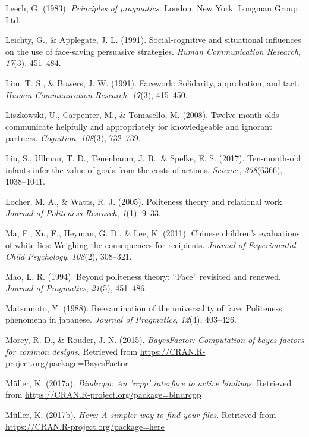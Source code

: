 \documentclass[oneside]{report}
\begin{document}
\hypertarget{ref-leech1983}{}
Leech, G. (1983). \emph{Principles of pragmatics}. London, New York:
Longman Group Ltd.

\hypertarget{ref-leichty1991}{}
Leichty, G., \& Applegate, J. L. (1991). Social-cognitive and
situational influences on the use of face-saving persuasive strategies.
\emph{Human Communication Research}, \emph{17}(3), 451--484.

\hypertarget{ref-lim1991}{}
Lim, T. S., \& Bowers, J. W. (1991). Facework: Solidarity, approbation,
and tact. \emph{Human Communication Research}, \emph{17}(3), 415--450.

\hypertarget{ref-liszkowski2008}{}
Liszkowski, U., Carpenter, M., \& Tomasello, M. (2008).
Twelve-month-olds communicate helpfully and appropriately for
knowledgeable and ignorant partners. \emph{Cognition}, \emph{108}(3),
732--739.

\hypertarget{ref-liu2017ten}{}
Liu, S., Ullman, T. D., Tenenbaum, J. B., \& Spelke, E. S. (2017).
Ten-month-old infants infer the value of goals from the costs of
actions. \emph{Science}, \emph{358}(6366), 1038--1041.

\hypertarget{ref-locher2005}{}
Locher, M. A., \& Watts, R. J. (2005). Politeness theory and relational
work. \emph{Journal of Politeness Research}, \emph{1}(1), 9--33.

\hypertarget{ref-ma2011}{}
Ma, F., Xu, F., Heyman, G. D., \& Lee, K. (2011). Chinese children's
evaluations of white lies: Weighing the consequences for recipients.
\emph{Journal of Experimental Child Psychology}, \emph{108}(2),
308--321.

\hypertarget{ref-mao1994}{}
Mao, L. R. (1994). Beyond politeness theory: ``Face'' revisited and
renewed. \emph{Journal of Pragmatics}, \emph{21}(5), 451--486.

\hypertarget{ref-matsumoto1988}{}
Matsumoto, Y. (1988). Reexamination of the universality of face:
Politeness phenomena in japanese. \emph{Journal of Pragmatics},
\emph{12}(4), 403--426.

\hypertarget{ref-R-BayesFactor}{}
Morey, R. D., \& Rouder, J. N. (2015). \emph{BayesFactor: Computation of
bayes factors for common designs}. Retrieved from
\url{https://CRAN.R-project.org/package=BayesFactor}

\hypertarget{ref-R-bindrcpp}{}
Müller, K. (2017a). \emph{Bindrcpp: An 'rcpp' interface to active
bindings}. Retrieved from
\url{https://CRAN.R-project.org/package=bindrcpp}

\hypertarget{ref-R-here}{}
Müller, K. (2017b). \emph{Here: A simpler way to find your files}.
Retrieved from \url{https://CRAN.R-project.org/package=here}
\end{document}
